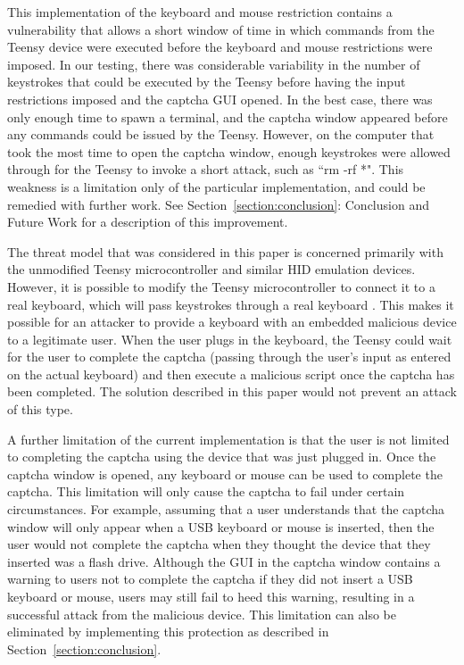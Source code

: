 \documentclass[pagenumbers]{ieee}
\begin{document}
This implementation of the keyboard and mouse restriction contains a vulnerability that allows a short window of time in which commands from the Teensy device were executed before the keyboard and mouse restrictions were imposed. In our testing, there was considerable variability in the number of keystrokes that could be executed by the Teensy before having the input restrictions imposed and the captcha GUI opened. In the best case, there was only enough time to spawn a terminal, and the captcha window appeared before any commands could be issued by the Teensy. However, on the computer that took the most time to open the captcha window, enough keystrokes were allowed through for the Teensy to invoke a short attack, such as ``rm -rf *".  This weakness is a limitation only of the particular implementation, and could be remedied with further work. See Section~\ref{section:conclusion}: Conclusion and Future Work for a description of this improvement.

The threat model that was considered in this paper is concerned primarily with the unmodified Teensy microcontroller and similar HID emulation devices. However, it is possible to modify the Teensy microcontroller to connect it to a real keyboard, which will pass keystrokes through a real keyboard \cite{pjrc}. This makes it possible for an attacker to provide a keyboard with an embedded malicious device to a legitimate user. When the user plugs in the keyboard, the Teensy could wait for the user to complete the captcha (passing through the user's input as entered on the actual keyboard) and then execute a malicious script once the captcha has been completed. The solution described in this paper would not prevent an attack of this type.

A further limitation of the current implementation is that the user is not limited to completing the captcha using the device that was just plugged in.  Once the captcha window is opened, any keyboard or mouse can be used to complete the captcha. This limitation will only cause the captcha to fail under certain circumstances. For example, assuming that a user understands that the captcha window will only appear when a USB keyboard or mouse is inserted, then the user would not complete the captcha when they thought the device that they inserted was a flash drive. Although the GUI in the captcha window contains a warning to users not to complete the captcha if they did not insert a USB keyboard or mouse, users may still fail to heed this warning, resulting in a successful attack from the malicious device. This limitation can also be eliminated by implementing this protection as described in Section~\ref{section:conclusion}.
\end{document}
